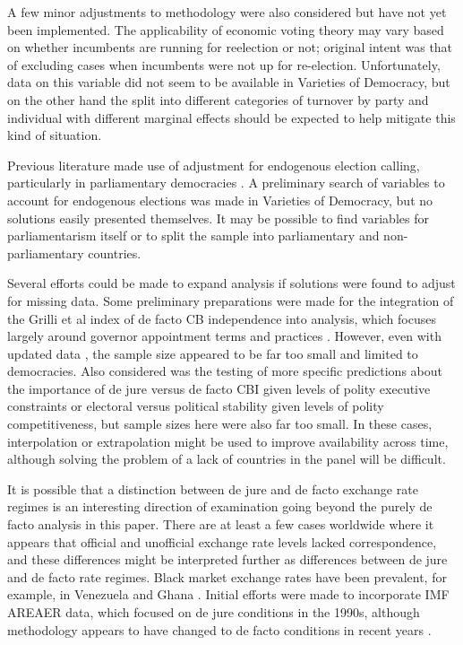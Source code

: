 \documentclass{article}
\begin{document}
    A few minor adjustments to methodology were also considered but have not yet been implemented. The applicability of economic voting theory may vary based on whether incumbents are running for reelection or not; original intent was that of excluding cases when incumbents were not up for re-election. Unfortunately, data on this variable did not seem to be available in Varieties of Democracy, but on the other hand the split into different categories of turnover by party and individual with different marginal effects should be expected to help mitigate this kind of situation.

    Previous literature made use of adjustment for endogenous election calling, particularly in parliamentary democracies \citep{bernhard_political_2002-1,clark_monetary_2013}. A preliminary search of variables to account for endogenous elections was made in Varieties of Democracy, but no solutions easily presented themselves. It may be possible to find variables for parliamentarism itself or to split the sample into parliamentary and non-parliamentary countries.

    Several efforts could be made to expand analysis if solutions were found to adjust for missing data. Some preliminary preparations were made for the integration of the Grilli et al index of de facto CB independence into analysis, which focuses largely around governor appointment terms and practices \citep{grilli_political_1991}. However, even with updated data \citep{romelli_regulatory_2015}, the sample size appeared to be far too small and limited to democracies. Also considered was the testing of more specific predictions about the importance of de jure versus de facto CBI given levels of polity executive constraints or electoral versus political stability given levels of polity competitiveness, but sample sizes here were also far too small. In these cases, interpolation or extrapolation might be used to improve availability across time, although solving the problem of a lack of countries in the panel will be difficult.

    It is possible that a distinction between de jure and de facto exchange rate regimes is an interesting direction of examination going beyond the purely de facto analysis in this paper. There are at least a few cases worldwide where it appears that official and unofficial exchange rate levels lacked correspondence, and these differences might be interpreted further as differences between de jure and de facto rate regimes. Black market exchange rates have been prevalent, for example, in Venezuela and Ghana \citep{kiguel_parallel_1995}. Initial efforts were made to incorporate IMF AREAER data, which focused on de jure conditions in the 1990s, although methodology appears to have changed to de facto conditions in recent years \citep{imf_imf_2020}.
\end{document}

